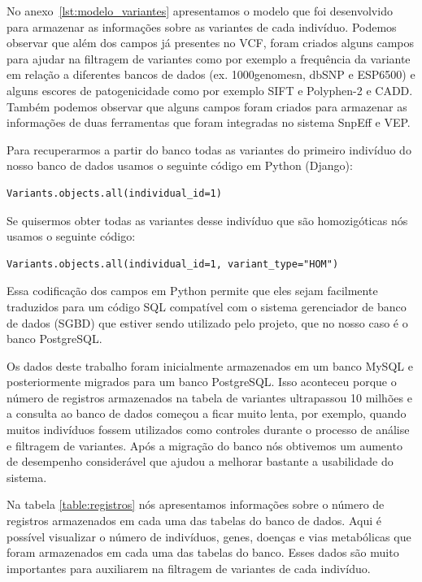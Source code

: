 No anexo~\ref{lst:modelo_variantes} apresentamos o modelo que foi desenvolvido para armazenar as informações sobre as variantes de cada indivíduo. Podemos observar que além dos campos já presentes no VCF, foram criados alguns campos para ajudar na filtragem de variantes como por exemplo a frequência da variante em relação a diferentes bancos de dados (ex. 1000genomesn, dbSNP e ESP6500) e alguns escores de patogenicidade como por exemplo SIFT e Polyphen-2 e CADD. Também podemos observar que alguns campos foram criados para armazenar as informações de duas ferramentas que foram integradas no sistema SnpEff e VEP.

Para recuperarmos a partir do banco todas as variantes do primeiro indivíduo do nosso banco de dados usamos o seguinte código em Python (Django):

\begin{verbatim}
Variants.objects.all(individual_id=1)
\end{verbatim}

Se quisermos obter todas as variantes desse indivíduo que são homozigóticas nós usamos o seguinte código:

\begin{verbatim}
Variants.objects.all(individual_id=1, variant_type="HOM")
\end{verbatim}

Essa codificação dos campos em Python permite que eles sejam facilmente traduzidos para um código SQL compatível com o sistema gerenciador de banco de dados (SGBD) que estiver sendo utilizado pelo projeto, que no nosso caso é o banco PostgreSQL.

Os dados deste trabalho foram inicialmente armazenados em um banco MySQL e posteriormente migrados para um banco PostgreSQL. Isso aconteceu porque o número de registros armazenados na tabela de variantes ultrapassou 10 milhões e a consulta ao banco de dados começou a ficar muito lenta, por exemplo, quando muitos indivíduos fossem utilizados como controles durante o processo de análise e filtragem de variantes. Após a migração do banco nós obtivemos um aumento de desempenho considerável que ajudou a melhorar bastante a usabilidade do sistema.

Na tabela \ref{table:registros} nós apresentamos informações sobre o número de registros armazenados em cada uma das tabelas do banco de dados. Aqui é possível visualizar o número de indivíduos, genes, doenças e vias metabólicas que foram armazenados em cada uma das tabelas do banco. Esses dados são muito importantes para auxiliarem na filtragem de variantes de cada indivíduo.



